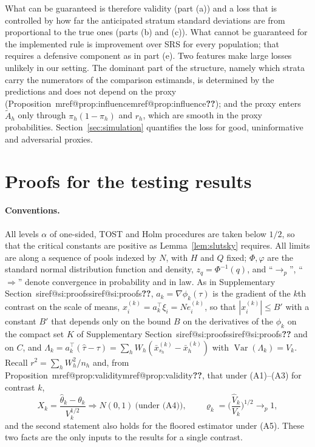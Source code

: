 \documentclass[pdflatex,sn-mathphys-num,iicol]{sn-jnl}
\makeatletter
\theoremstyle{thmstyleone}
\theoremstyle{thmstyletwo}
\theoremstyle{thmstylethree}
\newcommand{\SIref}[1]{\ifcsname siref@#1\endcsname\csname siref@#1\endcsname\else\textbf{??}\fi}
\newcommand{\Mref}[1]{\ifcsname mref@#1\endcsname\csname mref@#1\endcsname\else\textbf{??}\fi}
\makeatother
\begin{document}
What can be guaranteed is therefore validity (part (a)) and a loss that is controlled by how far
the anticipated stratum standard deviations are from proportional to the true ones (parts (b) and
(c)). What cannot be guaranteed for the implemented rule is improvement over SRS for every
population; that requires a defensive component as in part (e). Two features make large losses
unlikely in our setting. The dominant part of the structure, namely which strata carry the
numerators of the comparison estimands, is determined by the predictions and does not depend on the
proxy (Proposition~\Mref{prop:influence}); and the proxy enters $\tilde A_h$ only through
$\pi_h(1-\pi_h)$ and $r_h$, which are smooth in the proxy probabilities. Section~\ref{sec:simulation}
quantifies the loss for good, uninformative and adversarial proxies.
\section{Proofs for the testing results}\label{si:testing}

\paragraph{Conventions.} All levels $\alpha$ of one-sided, TOST and Holm procedures are taken below $1/2$, so that the critical constants are positive as Lemma~\ref{lem:slutsky} requires. All limits are along a sequence of pools indexed by $N$, with $H$ and $Q$ fixed; $\Phi,\varphi$ are the standard normal distribution function and density, $z_q=\Phi^{-1}(q)$, and
``$\to_p$'', ``$\Rightarrow$'' denote convergence in probability and in law. As in Supplementary Section~\SIref{si:proofs}, $a_k=\nabla\phi_k(\tau)$ is the gradient of the $k$th contrast on the scale of means, $x^{(k)}_i=a_k^\top\xi_i=Ne^{(k)}_i$, so that $|x^{(k)}_i|\le B'$ with a constant $B'$ that depends only on the bound $B$ on the derivatives of the $\phi_k$ on the compact set $K$ of Supplementary Section~\SIref{si:proofs} and on $C$, and
$\Lambda_k=a_k^\top(\hat\tau-\tau)=\sum_hW_h(\bar x^{(k)}_{s_h}-\bar x^{(k)}_h)$ with $\operatorname{Var}(\Lambda_k)=V_k$. Recall $r^2=\sum_hW_h^2/n_h$ and, from Proposition~\Mref{prop:validity}, that under (A1)--(A3) for contrast $k$,
\begin{equation}\label{eq:si-ingredients}
X_k=\frac{\hat\theta_k-\theta_k}{V_k^{1/2}}\Rightarrow N(0,1)\ \text{(under (A4))},\qquad
\varrho_k=\Big(\frac{\hat V_k}{V_k}\Big)^{1/2}\to_p1,
\end{equation}
and the second statement also holds for the floored estimator under (A5). These two facts are the only inputs to the results for a single contrast.
\end{document}

